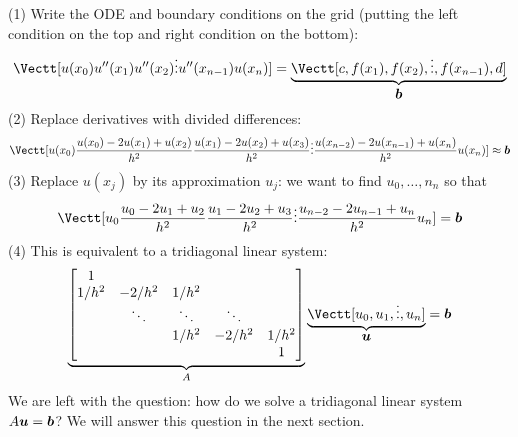 (1) Write the ODE and boundary conditions on the grid (putting the left condition on the top and right condition on the bottom):
\[
\Vectt[u(x_0) \\ 
u''(x_1) \\
u''(x_2) \\
\ensuremath{\vdots} \\
u''(x_{n-1}) \\
u(x_n)] = \underbrace{\Vectt[c, f(x_1), f(x_2), \ensuremath{\vdots} , f(x_{n-1}), d]}_{\ensuremath{\bm{\b}}}
\]
(2) Replace derivatives with divided differences:
\[
\Vectt[u(x_0) \\ 
{u(x_0) - 2u(x_1) + u(x_2)\over h^2} \\
{u(x_1) - 2u(x_2) + u(x_3)\over h^2} \\
\ensuremath{\vdots} \\
{u(x_{n-2}) - 2u(x_{n-1}) + u(x_n)\over h^2} \\
u(x_n)] \ensuremath{\approx} \ensuremath{\bm{\b}}
\]
(3) Replace $u(x_j)$  by its approximation $u_j$: we want to find $u_0,\ensuremath{\ldots},n_n$ so that
\[
\Vectt[u_0 \\ 
{u_0 - 2u_1 + u_2\over h^2} \\
{u_1 - 2u_2 + u_3\over h^2} \\
\ensuremath{\vdots} \\
{u_{n-2} - 2u_{n-1} + u_n\over h^2} \\
u_n] = \ensuremath{\bm{\b}}
\]
(4) This is equivalent to a tridiagonal linear system:
\[
\underbrace{\begin{bmatrix}
    1 \\ 
    1/h^2 & -2/h^2 & 1/h^2 \\
    & \ensuremath{\ddots} & \ensuremath{\ddots} & \ensuremath{\ddots} \\
   && 1/h^2 & -2/h^2 & 1/h^2 \\ 
   &&&& 1 \end{bmatrix}}_A \underbrace{\Vectt[u_0,u_1,\ensuremath{\vdots},u_n]}_{\ensuremath{\bm{\u}}} = \ensuremath{\bm{\b}}
\]
We are left with the question: how do we solve a tridiagonal linear system $A \bm{{\mbox{\boldmath$u$\unboldmath}}} = \bm{{\mbox{\boldmath$b$\unboldmath}}}$? We will answer this question in the next section.



